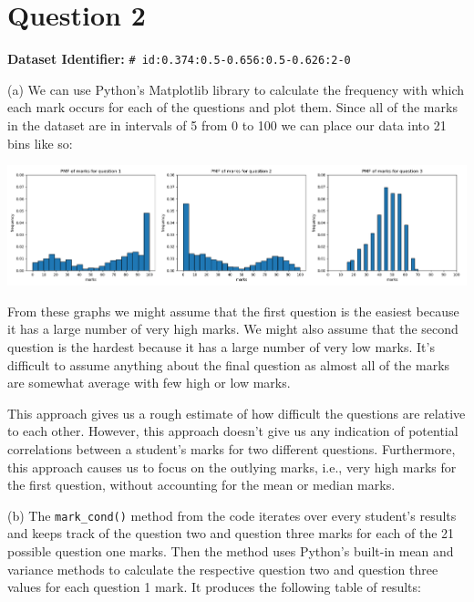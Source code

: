 \documentclass[10pt]{article}
\begin{document}
\section*{Question 2}

\noindent \textbf{Dataset Identifier:} \texttt{\# id:0.374:0.5-0.656:0.5-0.626:2-0}

\noindent (a) We can use Python's Matplotlib library to calculate the frequency with which each mark occurs for each of the questions and plot them. Since all of the marks in the dataset are in intervals of 5 from 0 to 100 we can place our data into 21 bins like so:

\begin{center}
    \includegraphics[scale=0.5]{q2_a.png}
\end{center}

From these graphs we might assume that the first question is the easiest because it has a large number of very high marks. We might also assume that the second question is the hardest because it has a large number of very low marks. It's difficult to assume anything about the final question as almost all of the marks are somewhat average with few high or low marks.

This approach gives us a rough estimate of how difficult the questions are relative to each other. However, this approach doesn't give us any indication of potential correlations between a student's marks for two different questions. Furthermore, this approach causes us to focus on the outlying marks, i.e., very high marks for the first question, without accounting for the mean or median marks.

\noindent (b) The \texttt{mark\_cond()} method from the code iterates over every student's results and keeps track of the question two and question three marks for each of the 21 possible question one marks. Then the method uses Python's built-in mean and variance methods to calculate the respective question two and question three values for each question 1 mark. It produces the following table of results:
\end{document}

